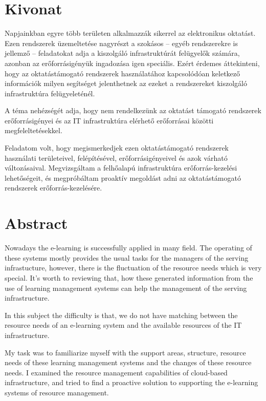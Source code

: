 \chapter*{Kivonat}

Napjainkban egyre több területen alkalmazzák sikerrel az elektronikus oktatást. Ezen rendszerek üzemeltetése nagyrészt a szokásos -- egyéb rendszerekre is jellemző -- feladatokat adja a kiszolgáló infrastruktúrát felügyelők számára, azonban az erőforrásigényük ingadozása igen speciális. Ezért érdemes áttekinteni, hogy az oktatástámogató rendszerek használatához kapcsolódóan keletkező információk milyen segítséget jelenthetnek az ezeket a rendszereket kiszolgáló infrastruktúra felügyeleténél.

A téma nehézségét adja, hogy nem rendelkezünk az oktatást támogató rendszerek erőforrásigényei és az IT infrastruktúra elérhető erőforrásai közötti megfeleltetésekkel.

Feladatom volt, hogy megismerkedjek ezen oktatástámogató rendszerek használati területeivel, felépítésével, erőforrásigényeivel és azok várható változásaival. Megvizsgáltam a felhőalapú infrastruktúra erőforrás-kezelési lehetőségeit, és megpróbáltam proaktív megoldást adni az oktatástámogató rendszerek erőforrás-kezelésére.
\vfill

\chapter*{Abstract}

Nowadays the e-learning is successfully applied in many field. The operating of these systems mostly provides the usual tasks for the managers of the serving infrastucture, however, there is the fluctuation of the resource needs which is very special. It's worth to reviewing that, how these generated information from the use of learning management systems can help the management of the serving infrastructure.

In this subject the difficulty is that, we do not have matching between the resource needs of an e-learning system and the available resources of the IT infrastructure.

My task was to familiarize myself with the support areas, structure, resource needs of these learning management systems and the changes of these resource needs. I examined the resource management capabilities of cloud-based infrastructure, and tried to find a proactive solution to supporting the e-learning systems of resource management.

\vfill


